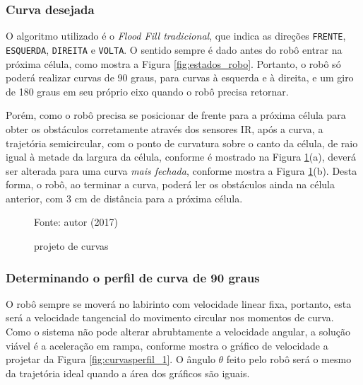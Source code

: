 	\subsubsection{Curva desejada}
	
	O algoritmo utilizado é o \emph{Flood Fill tradicional}, que indica as direções \texttt{FRENTE}, \texttt{ESQUERDA}, \texttt{DIREITA} e \texttt{VOLTA}.  O sentido sempre é dado antes do robô entrar na próxima célula, como mostra a Figura \ref{fig:estados_robo}. Portanto, o robô só poderá realizar curvas de 90 graus, para curvas à esquerda e à direita, e um giro de 180 graus em seu próprio eixo quando o robô precisa retornar.

	Porém, como o robô precisa se posicionar de frente para a próxima célula para obter os obstáculos corretamente através dos sensores IR, após a curva, a trajetória semicircular, com o ponto de curvatura sobre o canto da célula, de raio igual à metade da largura da célula, conforme é mostrado na Figura \ref{fig:curvas_perfil}(a), deverá ser alterada para uma curva \emph{mais fechada}, conforme mostra a Figura \ref{fig:curvas_perfil}(b). Desta forma, o robô, ao terminar a curva, poderá ler os obstáculos ainda na célula anterior, com 3 cm de distância para a próxima célula.
	

\begin{figure}[!htb]
	\caption[Projeto de curvas]{\label{fig:curvas_perfil}projeto de curvas}
	\begin{center}
		\hspace*{0.1\linewidth}
	\end{center}
	\centering
	\small Fonte: autor (2017)
\end{figure}


	\subsubsection{Determinando o perfil de curva de 90 graus}
	O robô sempre se moverá no labirinto com velocidade linear fixa, portanto, esta será a velocidade tangencial do movimento circular nos momentos de curva. Como o sistema não pode alterar abrubtamente a velocidade angular, a solução viável é a aceleração em rampa, conforme mostra o gráfico de velocidade a projetar da Figura \ref{fig:curvasperfil_1}. O ângulo $\theta$ feito pelo robô será o mesmo da trajetória ideal quando a área dos gráficos são iguais.

